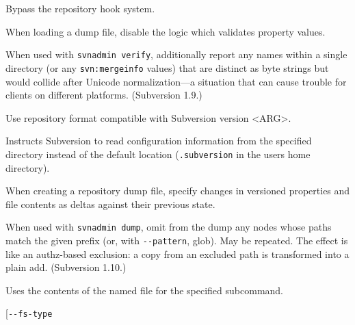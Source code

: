 \begin{description}
\item[\protect{}\label{svn.ref.svnadmin.sw.bypass_hooks}{}\texttt{-\/-bypass-hooks}]
Bypass the repository hook system.
\item[\protect{}\label{svn.ref.svnadmin.sw.bypass_prop_validation}{}\texttt{-\/-bypass-prop-validation}]
When loading a dump file, disable the logic which validates property
values.
\item[\protect{}\label{svn.ref.svnadmin.sw.check_normalization}{}\texttt{-\/-check-normalization}]
When used with \texttt{svnadmin\ verify}, additionally report any names
within a single directory (or any \texttt{svn:mergeinfo} values) that are
distinct as byte strings but would collide after Unicode normalization---a
situation that can cause trouble for clients on different platforms.
(Subversion 1.9.)
\item[\protect{}\label{svn.ref.svnadmin.sw.compatible_version}{}\texttt{-\/-compatible-version}
\textless ARG\textgreater{}]
Use repository format compatible with Subversion version
\textless ARG\textgreater.
\item[\protect{}\label{svn.ref.svnadmin.sw.config_dir}{}\texttt{-\/-config-dir}
\textless DIR\textgreater{}]
Instructs Subversion to read configuration information from the
specified directory instead of the default location
(\texttt{.subversion} in the user\textquotesingle s home directory).
\item[\protect{}\label{svn.ref.svnadmin.sw.deltas}{}\texttt{-\/-deltas}]
When creating a repository dump file, specify changes in versioned
properties and file contents as deltas against their previous state.
\item[\protect{}\label{svn.ref.svnadmin.sw.exclude}{}\texttt{-\/-exclude}
\textless ARG\textgreater{}]
When used with \texttt{svnadmin\ dump}, omit from the dump any nodes whose
paths match the given prefix (or, with \texttt{-\/-pattern}, glob). May be
repeated. The effect is like an authz-based exclusion: a copy from an
excluded path is transformed into a plain add. (Subversion 1.10.)
\item[\protect{}\label{svn.ref.svnadmin.sw.file}{}\texttt{-\/-file}
(\texttt{-F}) \textless FILENAME\textgreater{}]
Uses the contents of the named file for the specified subcommand.
\item[\protect{}\label{svn.ref.svnadmin.sw.fs_type}{}\texttt{-\/-fs-type}

\end{description}
